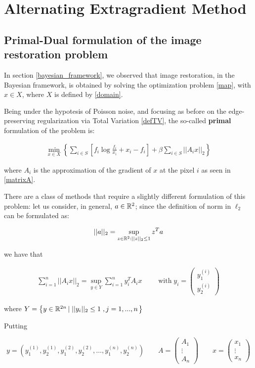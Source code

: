 \chapter{Alternating Extragradient Method}

\section{Primal-Dual formulation of the image restoration problem}

In section \ref{bayesian_framework}, we observed that image restoration, in the Bayesian framework, is obtained by solving the optimization problem \eqref{map}, with $x \in X$, where $X$ is defined by \eqref{domain}.

Being under the hypotesis of Poisson noise, and focusing as before on the edge-preserving regularization via Total Variation \eqref{defTV}, the so-called \textbf{primal} formulation of the problem is:

\begin{align}
\label{KL-TV}
\min_{x \in X} \left\{ \sum_{i \in S} \left[f_i \log{\frac{f_i}{x_i}}+x_i - f_i\right] + \beta \sum_{i \in S} ||A_i x||_2 \right\}
\end{align}

where $A_i$ is the approximation of the gradient of $x$ at the pixel $i$ as seen in \eqref{matrixA}.

There are a class of methods that require a slightly different formulation of this problem: let us consider, in general, $a \in \mathbb{R}^2$; since the definition of norm in $\ell_2$ can be formulated as:

$$||a||_2 = \sup_{z \in \mathbb{R}^2 : ||z||_2 \leq 1} z^T a$$

we have that

\begin{align}
\label{Aix}
\sum_{i=1}^n ||A_i x||_2 = \sup_{y \in Y} \sum_{i=1}^n y_i^T A_i x \qquad \mbox{ with} \; y_i = \begin{pmatrix} y_1^{(i)} \\
y_2^{(i)}\end{pmatrix}
\end{align}

where $Y = \left\{ y \in \mathbb{R}^{2n} \left |\; ||y_i||_2 \leq 1\;, j=1,...,n\right. \right\}$

Putting

$$ y = \left(y_1^{(1)},y_2^{(1)},y_1^{(2)},y_2^{(2)},\dots,y_1^{(n)},y_2^{(n)}\right)
\qquad A = \begin{pmatrix} A_1 \\
\vdots \\
A_n \end{pmatrix} \qquad x = \begin{pmatrix} x_1 \\
\vdots \\
x_n \end{pmatrix} $$

